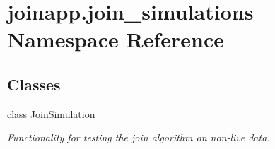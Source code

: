 \hypertarget{namespacejoinapp_1_1join__simulations}{}\section{joinapp.\+join\+\_\+simulations Namespace Reference}
\label{namespacejoinapp_1_1join__simulations}
\subsection*{Classes}
\begin{DoxyCompactItemize}
\item 
class \mbox{\hyperlink{classjoinapp_1_1join__simulations_1_1_join_simulation}{Join\+Simulation}}
\begin{DoxyCompactList}\small\item\em Functionality for testing the join algorithm on non-\/live data. \end{DoxyCompactList}\end{DoxyCompactItemize}
